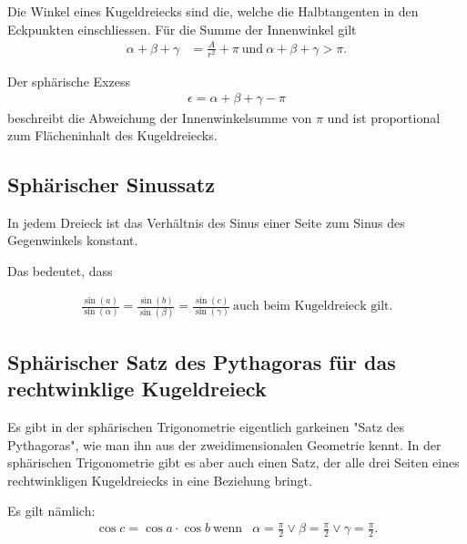 Die Winkel eines Kugeldreiecks sind die, welche die Halbtangenten in den Eckpunkten einschliessen. 
Für die Summe der Innenwinkel gilt
\begin{align}
	\alpha+\beta+\gamma &= \frac{A}{r^2} + \pi \ \text{und} \ \alpha+\beta+\gamma > \pi. \nonumber
\end{align}

Der sphärische Exzess
\begin{align}
	\epsilon = \alpha+\beta+\gamma - \pi \nonumber
\end{align}  
beschreibt die Abweichung der Innenwinkelsumme von $\pi$ und ist proportional zum Flächeninhalt des Kugeldreiecks.

\subsection{Sphärischer Sinussatz}
In jedem Dreieck ist das Verhältnis des Sinus einer Seite zum Sinus des Gegenwinkels konstant. 

Das bedeutet, dass

\begin{align}
	\frac{\sin (a)}{\sin (\alpha)} =\frac{\sin (b)}{\sin (\beta)} = \frac{\sin (c)}{\sin (\gamma)} \nonumber \ \text{auch beim Kugeldreieck gilt.}
\end{align}



\subsection{Sphärischer Satz des Pythagoras für das rechtwinklige Kugeldreieck}
Es gibt in der sphärischen Trigonometrie eigentlich garkeinen "Satz des Pythagoras", wie man ihn aus der zweidimensionalen Geometrie kennt.
In der sphärischen Trigonometrie gibt es aber auch einen Satz, der alle drei Seiten eines rechtwinkligen Kugeldreiecks in eine Beziehung bringt. 

Es gilt nämlich:
\begin{align}
	\cos c = \cos a \cdot \cos b \ \text{wenn} \nonumber &
	\alpha = \frac{\pi}{2} \lor \beta =\frac{\pi}{2} \lor \gamma = \frac{\pi}{2}.\nonumber
\end{align}
 